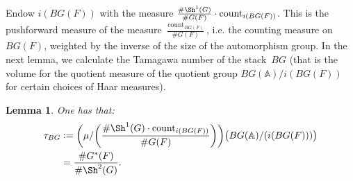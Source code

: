 \documentclass[a4paper,english,12pt]{amsart}
\newcommand{\AAA}{\mathbb A}
\DeclareMathOperator{\coun}{count}
\def\no{n\textsuperscript{0}\,}
\newtheorem{lem}[equation]{Lemma}
\numberwithin{equation}{subsection}
\begin{document}
Endow $i(BG(F))$ with the measure $\frac{\#\Sh^1(G)}{\#G(F)}\cdot \coun_{i(BG(F))}$.  %
This is the pushforward measure of the measure $\frac{\coun_{BG(F)}}{\# G(F)}$, i.e. the counting measure on $BG(F)$, weighted by the inverse of the size of the automorphism group. In the next lemma, we calculate the Tamagawa number of the stack~$BG$ (that is the volume for the quotient measure \cite[Chapter VII, \S 2, \no 7, Proposition 10]{Integrationd} of the quotient group $BG(\AAA)/i(BG(F))$ for certain choices of Haar measures). 
\begin{lem}\label{tamagawabg}
One has that:
\begin{align*}
\tau_{BG}&:=\bigg(\mu/\bigg(\frac{\#\Sh^1(G)\cdot\coun_{i(BG(F))}}{\#G(F)}\bigg)\bigg)\big(BG(\AAA)/(i(BG(F)))\big)\\
&=\frac{\# G^*(F)}{\#\Sh^2(G)}.
\end{align*}
\end{lem}
\end{document}
